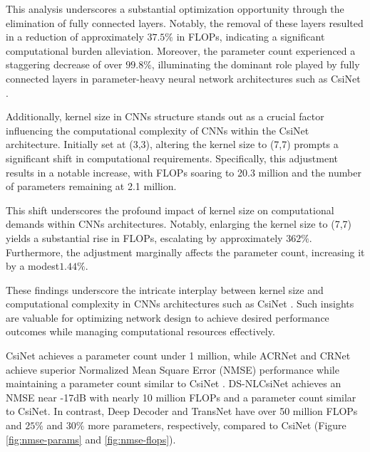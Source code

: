 \documentclass[lettersize,journal]{IEEEtran}
\begin{document}
This analysis underscores a substantial optimization opportunity through the elimination of fully connected layers. Notably, the removal of these layers resulted in a reduction of approximately 
\begin{math}37.5\%\end{math} in FLOPs, indicating a significant computational burden alleviation. Moreover, the parameter count experienced a staggering decrease of over \begin{math}99.8\%\end{math}, illuminating the dominant role played by fully connected layers in parameter-heavy neural network architectures such as CsiNet \cite{abe}.

Additionally, kernel size in CNNs structure stands out as a crucial factor influencing the computational complexity of CNNs  within the CsiNet \cite{abe} architecture. Initially set at (3,3), altering the kernel size to (7,7) prompts a significant shift in computational requirements. Specifically, this adjustment results in a notable increase, with FLOPs soaring to 20.3 million and the number of parameters remaining at 2.1 million.

This shift underscores the profound impact of kernel size on computational demands within CNNs architectures. Notably, enlarging the kernel size to (7,7) yields a substantial rise in FLOPs, escalating by approximately 
\begin{math}362\%\end{math}. Furthermore, the adjustment marginally affects the parameter count, increasing it by a modest\begin{math}1.44\%\end{math}.

These findings underscore the intricate interplay between kernel size and computational complexity in CNNs architectures such as CsiNet \cite{abe}. Such insights are valuable for optimizing network design to achieve desired performance outcomes while managing computational resources effectively.

CsiNet \cite{abe} achieves a parameter count under 1 million, while ACRNet \cite{abx} and CRNet \cite{abn} achieve superior Normalized Mean Square Error (NMSE) performance while maintaining a parameter count similar to CsiNet \cite{abe}. DS-NLCsiNet \cite{abq} achieves an NMSE near -17dB with nearly 10 million FLOPs and a parameter count similar to CsiNet. In contrast, Deep Decoder \cite{aby} and TransNet \cite{abz} have over 50 million FLOPs and \begin{math} 25\%\end{math} and \begin{math} 30\%\end{math} more parameters, respectively, compared to CsiNet (Figure \ref{fig:nmse-params} and \ref{fig:nmse-flops}).
\end{document}
